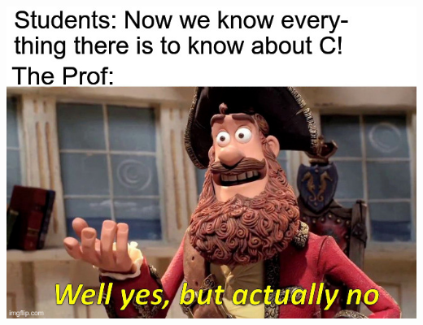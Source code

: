 \documentclass[11pt]{beamer}
\begin{document}
\begin{frame}
\vspace{1em}
\includegraphics[scale=0.2]{weredone.jpg}
\end{frame}
\end{document}
